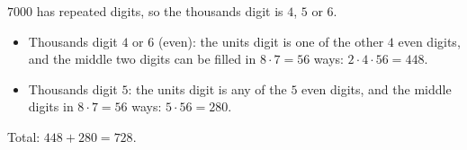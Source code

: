 $7000$ has repeated digits, so the thousands digit is $4$, $5$ or $6$.
\begin{itemize}
\item Thousands digit $4$ or $6$ (even): the units digit is one of the other $4$ even digits, and the middle two digits can be filled in $8\cdot7=56$ ways: $2\cdot4\cdot56=448$.
\item Thousands digit $5$: the units digit is any of the $5$ even digits, and the middle digits in $8\cdot7=56$ ways: $5\cdot56=280$.
\end{itemize}
Total: $448+280=\boxed{728}$.
